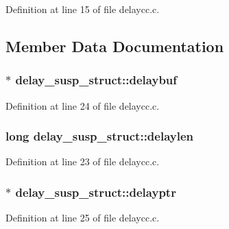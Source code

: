 Definition at line 15 of file delaycc.\+c.



\subsection{Member Data Documentation}
\subsubsection[{\texorpdfstring{delaybuf}{delaybuf}}]{$\ast$ delay\+\_\+susp\+\_\+struct\+::delaybuf}\hypertarget{structdelay__susp__struct_aafc2a56a784722ca0a4bf7a387a270b3}{}\label{structdelay__susp__struct_aafc2a56a784722ca0a4bf7a387a270b3}


Definition at line 24 of file delaycc.\+c.

\subsubsection[{\texorpdfstring{delaylen}{delaylen}}]{\setlength{\rightskip}{0pt plus 5cm}long delay\+\_\+susp\+\_\+struct\+::delaylen}\hypertarget{structdelay__susp__struct_aa4e0b3bb633c2394c801875a02e8493a}{}\label{structdelay__susp__struct_aa4e0b3bb633c2394c801875a02e8493a}


Definition at line 23 of file delaycc.\+c.

\subsubsection[{\texorpdfstring{delayptr}{delayptr}}]{$\ast$ delay\+\_\+susp\+\_\+struct\+::delayptr}\hypertarget{structdelay__susp__struct_ae00f926bff77a7dbd3f4bf0429138ee1}{}\label{structdelay__susp__struct_ae00f926bff77a7dbd3f4bf0429138ee1}


Definition at line 25 of file delaycc.\+c.

